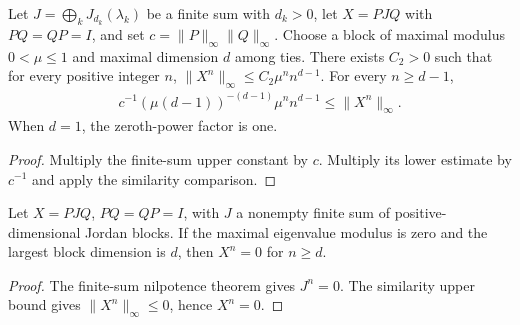 \begin{theorem}
    \label{thm:wolf_supplied_jordan_similarity_scaling}
    \leanok
    Let $J=\bigoplus_k J_{d_k}(\lambda_k)$ be a finite sum with $d_k>0$,
    let $X=PJQ$ with $PQ=QP=I$, and set
    $c=\lVert P\rVert_\infty\lVert Q\rVert_\infty$.
    Choose a block of maximal modulus $0<\mu\le1$ and maximal dimension $d$
    among ties. There exists $C_2>0$ such that for every positive integer $n$,
    $\lVert X^n\rVert_\infty\le C_2\mu^n n^{d-1}$.
    For every $n\ge d-1$,
    \begin{align}
      c^{-1}(\mu(d-1))^{-(d-1)}\mu^n n^{d-1}
      \le\lVert X^n\rVert_\infty.
    \end{align}
    When $d=1$, the zeroth-power factor is one.
\end{theorem}
\begin{proof}
    \leanok
    Multiply the finite-sum upper constant by $c$. Multiply its lower
    estimate by $c^{-1}$ and apply the similarity comparison.
\end{proof}


\begin{theorem}
    \label{thm:wolf_supplied_jordan_nilpotence}
    \leanok
    Let $X=PJQ$, $PQ=QP=I$, with $J$ a nonempty finite sum of
    positive-dimensional Jordan blocks. If the maximal eigenvalue modulus
    is zero and the largest block dimension is $d$, then $X^n=0$ for $n\ge d$.
\end{theorem}
\begin{proof}
    \leanok
    The finite-sum nilpotence theorem gives $J^n=0$. The similarity upper
    bound gives $\lVert X^n\rVert_\infty\le0$, hence $X^n=0$.
\end{proof}
